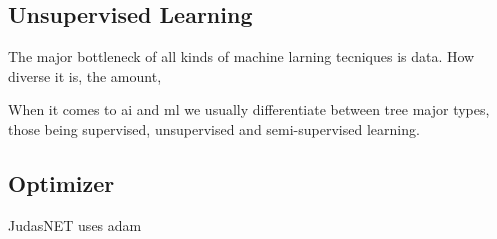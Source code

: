 \subsection{Unsupervised Learning}

The major bottleneck of all kinds of machine larning tecniques is data. How diverse it is, the amount, 

When it comes to \acrshort{ai} and \acrshort{ml} we usually differentiate between tree major types, those being supervised, unsupervised and semi-supervised learning. 

\subsection{Optimizer}

JudasNET uses \Gls{adam}